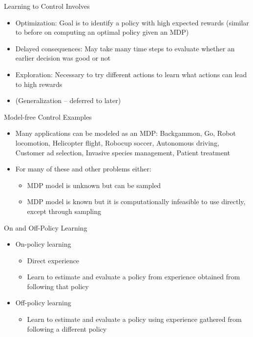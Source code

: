 \documentclass[aspectratio=169]{../latex_main/tntbeamer}  %
\begin{document}
\begin{frame}[c]{Learning to Control Involves}
	
	\begin{itemize}
		\item Optimization: Goal is to identify a policy with high expected rewards (similar to before on computing an optimal policy \alert{given} an MDP)
		\item Delayed consequences: May take many time steps to evaluate whether an earlier decision was good or not
		\item Exploration: Necessary to try different actions to learn what actions can lead to high rewards
		\item (Generalization -- deferred to later)
	\end{itemize}
	
\end{frame}
\begin{frame}[c]{Model-free Control Examples}
	
	\begin{itemize}
		\item Many applications can be modeled as an MDP: Backgammon, Go, Robot locomotion, Helicopter flight, Robocup soccer, Autonomous driving, Customer ad selection, Invasive species management, Patient
		treatment
		\item For many of these and other problems either:
		\begin{itemize}
			\item MDP model is unknown but can be sampled
			\item MDP model is known but it is computationally infeasible to use directly, except through sampling
		\end{itemize}
	\end{itemize}
	
\end{frame}
\begin{frame}[c]{On and Off-Policy Learning}
	
	\begin{itemize}
		\item On-policy learning
		\begin{itemize}
			\item Direct experience
			\item Learn to estimate and evaluate a policy from experience obtained from following \alert{that} policy
		\end{itemize}
		\pause
		\medskip
		\item Off-policy learning
		\begin{itemize}
			\item Learn to estimate and evaluate a policy using experience gathered from following a \alert{different} policy
		\end{itemize}
	\end{itemize}
	
\end{frame}
\end{document}
